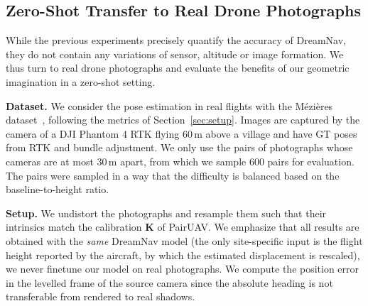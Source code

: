 \subsection{Zero-Shot Transfer to Real Drone Photographs}
\label{sec:real}

While the previous experiments precisely quantify the accuracy of DreamNav, they do not contain any variations of sensor, altitude or image formation. We thus turn to real drone photographs and evaluate the benefits of our geometric imagination in a zero-shot setting.

\noindent \textbf{Dataset.} We consider the pose estimation in real flights with the M\'ezi\`eres dataset~\citep{heigvd_mezieres}, following the metrics of Section~\ref{sec:setup}. Images are captured by the camera of a DJI Phantom 4 RTK flying 60\,m above a village and have GT poses from RTK and bundle adjustment. We only use the pairs of photographs whose cameras are at most 30\,m apart, from which we sample 600 pairs for evaluation. The pairs were sampled in a way that the difficulty is balanced based on the baseline-to-height ratio.

\noindent \textbf{Setup.} We undistort the photographs and resample them such that their intrinsics match the calibration $\mathbf{K}$ of PairUAV. We emphasize that all results are obtained with the \emph{same} DreamNav model (the only site-specific input is the flight height reported by the aircraft, by which the estimated displacement is rescaled), \ie we never finetune our model on real photographs. We compute the position error in the levelled frame of the source camera since the absolute heading is not transferable from rendered to real shadows.

